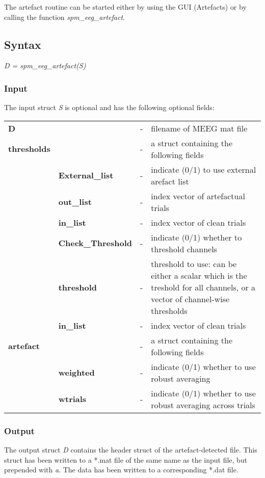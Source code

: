 The artefact routine can be started either by using the GUI
(Artefacts) or by calling the function \textit{spm\_eeg\_artefact}.

\subsection{Syntax}
\textit{D = spm\_eeg\_artefact(S)}
\\

\subsubsection{Input}
The input struct {\it S} is optional and has the following optional fields:

\begin{tabular}{llcp{9cm}}
{\bf D} & & - & filename of MEEG mat file\\
{\bf thresholds}&  & - & a struct containing the following fields\\
& {\bf External\_list} & - & indicate (0/1) to use external arefact list\\
& {\bf out\_list} & - & index vector of artefactual trials \\
& {\bf in\_list} & - & index vector of clean trials\\
& {\bf Check\_Threshold} & - & indicate (0/1) whether to threshold
channels\\
& {\bf threshold} & - & threshold to use: can be either a scalar which
is the treshold for all channels, or a vector of channel-wise
thresholds\\ 
& {\bf in\_list} & - & index vector of clean trials\\
{\bf artefact}&  & - & a struct containing the following fields\\
& {\bf weighted} & - & indicate (0/1) whether to use robust averaging\\
& {\bf wtrials} & - &  indicate (0/1) whether to use robust averaging
across trials\\
\end{tabular}

\subsubsection{Output}
The output struct {\it D} contains the header struct of the artefact-detected
file. This struct has been written to a *.mat file of the same name as
the input file, but prepended with {\it a}. The data has been
written to a corresponding *.dat file.

